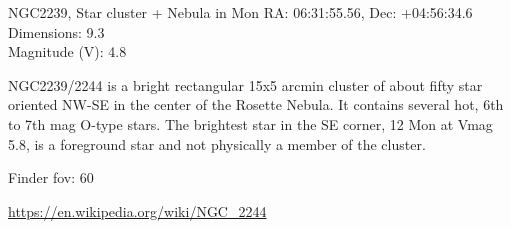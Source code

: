 \begin{block}{NGC2239, Star cluster + Nebula in Mon}
    RA: 06:31:55.56, Dec: +04:56:34.6 \\ 
    Dimensions: 9.3 \\ 
    Magnitude (V): 4.8

    NGC2239/2244 is a bright rectangular 15x5 arcmin cluster of about fifty
    star oriented NW-SE in the center of the Rosette Nebula. It contains
    several hot, 6th to 7th mag O-type stars. The brightest star in the SE
    corner, 12 Mon at Vmag 5.8, is a foreground star and not physically a
    member of the cluster.


    Finder fov: 60 

    \url{https://en.wikipedia.org/wiki/NGC_2244} 
\end{block}
